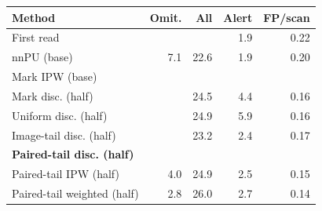 \begin{tabular}{lrrrr}
\toprule
Method & Omit. & All & Alert & FP/scan \\
\midrule
First read & \OmitFirst{} & \AllFirst{} & 1.9 & 0.22 \\
nnPU (base) & 7.1 & 22.6 & 1.9 & 0.20 \\
Mark IPW (base) & \IpwPrimary{} & \AllIpw{} & \AlertIpw{} & \FPIpw{} \\
Mark disc. (half) & \OmitMarkDisc{} & 24.5 & 4.4 & 0.16 \\
Uniform disc. (half) & \OmitUniformDisc{} & 24.9 & 5.9 & 0.16 \\
Image-tail disc. (half) & \OmitImageDisc{} & 23.2 & 2.4 & 0.17 \\
\textbf{Paired-tail disc. (half)} & \PairPrimary{} & \AllPair{} & \AlertPair{} & \FPPair{} \\
Paired-tail IPW (half) & 4.0 & 24.9 & 2.5 & 0.15 \\
Paired-tail weighted (half) & 2.8 & 26.0 & 2.7 & 0.14 \\
\bottomrule
\end{tabular}
